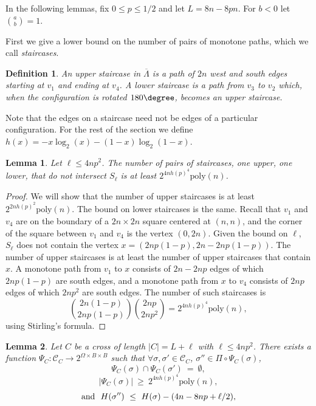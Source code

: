 \documentclass[letterpaper,english,numberwithinsect]{amsart}
\newtheorem{lemma}{Lemma}[section]
\newtheorem{definition}{Definition}[section]
\newcommand{\cC}{\mathcal{C}}
\begin{document}
In the following lemmas, fix $0\leq p \leq 1/2$ and let $L = 8n-8pn$. 
For $b<0$ let $\binom{a}{b} = 1$.

First we give a lower bound on the number of pairs of monotone paths, which we call {\em staircases}.
\begin{definition}
An {\em upper staircase} in $\overline{\Lambda}$ is a path of $2n$ west and south edges starting at $v_1$ and ending at $v_4$. A {\em lower staircase} is a path from $v_3$ to $v_2$ which, when the configuration is rotated $180\degree$, becomes an upper staircase.
\end{definition}
Note that the edges on a staircase need not be edges of a particular configuration. 
For the rest of the section we define $h(x) = -x\log_2(x) - (1-x)\log_2(1-x)$.

\begin{lemma}\label{lem_num_staircases}
Let $\ell \leq 4np^2$. 
The number of pairs of staircases, one upper, one lower, that do not intersect $S_{\ell}$ is at least 
$2^{4n h(p)^4}\mathrm{poly}(n)$.
\end{lemma}
\begin{proof}
We will show that the number of upper staircases is at least $2^{2n h(p)^2}\mathrm{poly}(n)$.
The bound on lower staircases is the same.
Recall that $v_1$ and $v_4$ are on the boundary of a $2n\times 2n$ square centered at $(n, n)$, and the corner of the square between $v_1$ and $v_4$ is the vertex $(0, 2n)$. 
Given the bound on $\ell$, $S_{\ell}$ does not contain the vertex $x = (2np(1-p), 2n - 2np(1-p))$.
The number of upper staircases is at least the number of upper staircases that contain $x$. 
A monotone path from $v_1$ to $x$ consists of $2n - 2np$ edges of which $2np(1-p)$ are south edges, 
and a monotone path from $x$ to $v_4$ consists of $2np$ edges of which $2np^2$ are south edges.
The number of such staircases is
\begin{equation}
\binom{2n(1-p)}{2np(1-p)}\binom{2np}{2np^2} = 2^{4n h(p)^4}\mathrm{poly}(n),
\end{equation}
using Stirling's formula.
\end{proof}

\begin{lemma}\label{lem:mapping-bound}
Let $C$ be a cross of length $|C| = L + \ell$ with $\ell \leq 4np^2$.
There exists a function $\Psi_C: \cC_C  \rightarrow 2^{\Omega \times B \times B}$ such that 
$\forall \sigma, \sigma' \in \cC_C $, $\sigma'' \in \Pi\circ\Psi_C(\sigma)$,
$$
 \Psi_C(\sigma) \cap \Psi_C(\sigma') \ = \ \emptyset, $$
$$ |\Psi_C(\sigma)| \ \geq \  2^{4n h(p)^4}\mathrm{poly}(n), $$ 
$$ {\rm and} \  \ H(\sigma'') \ \leq \ H(\sigma) - (4n-8np+\ell/2),$$
\end{lemma}
\end{document}
